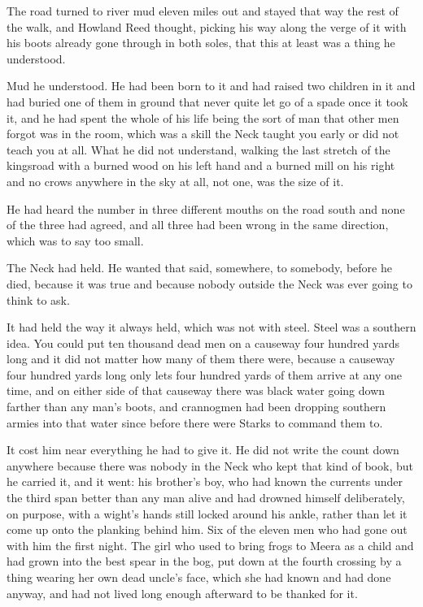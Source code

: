 The road turned to river mud eleven miles out and stayed that way the rest of the walk, and Howland Reed thought, picking his way along the verge of it with his boots already gone through in both soles, that this at least was a thing he understood.

Mud he understood. He had been born to it and had raised two children in it and had buried one of them in ground that never quite let go of a spade once it took it, and he had spent the whole of his life being the sort of man that other men forgot was in the room, which was a skill the Neck taught you early or did not teach you at all. What he did not understand, walking the last stretch of the kingsroad with a burned wood on his left hand and a burned mill on his right and no crows anywhere in the sky at all, not one, was the size of it.

He had heard the number in three different mouths on the road south and none of the three had agreed, and all three had been wrong in the same direction, which was to say too small.

\sceneBreak

The Neck had held. He wanted that said, somewhere, to somebody, before he died, because it was true and because nobody outside the Neck was ever going to think to ask.

It had held the way it always held, which was not with steel. Steel was a southern idea. You could put ten thousand dead men on a causeway four hundred yards long and it did not matter how many of them there were, because a causeway four hundred yards long only lets four hundred yards of them arrive at any one time, and on either side of that causeway there was black water going down farther than any man’s boots, and crannogmen had been dropping southern armies into that water since before there were Starks to command them to.

It cost him near everything he had to give it. He did not write the count down anywhere because there was nobody in the Neck who kept that kind of book, but he carried it, and it went: his brother’s boy, who had known the currents under the third span better than any man alive and had drowned himself deliberately, on purpose, with a wight’s hands still locked around his ankle, rather than let it come up onto the planking behind him. Six of the eleven men who had gone out with him the first night. The girl who used to bring frogs to Meera as a child and had grown into the best spear in the bog, put down at the fourth crossing by a thing wearing her own dead uncle’s face, which she had known and had done anyway, and had not lived long enough afterward to be thanked for it.

